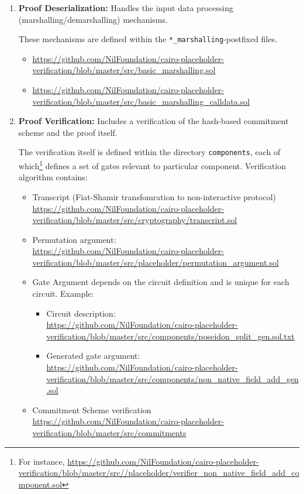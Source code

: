 \begin{enumerate}
    \item \textbf{Proof Deserialization:} Handles the input data processing (marshalling/demarshalling) mechanisms.

    These mechanisms are defined within the \texttt{*\_marshalling}-postfixed files.
    \begin{itemize}
        \item
            \url{https://github.com/NilFoundation/cairo-placeholder-verification/blob/master/src/basic_marshalling.sol}
        \item
            \url{https://github.com/NilFoundation/cairo-placeholder-verification/blob/master/src/basic_marshalling_calldata.sol}
    \end{itemize}

    \item \textbf{Proof Verification:} Includes a verification of the hash-based commitment scheme and the proof itself.

    The verification itself is defined within the directory \texttt{components}, each of which\footnote{
        For instance, \url{https://github.com/NilFoundation/cairo-placeholder-verification/blob/master/src//placeholder/verifier_non_native_field_add_component.sol}
    } defines a set of gates
    relevant to particular component.
    Verification algorithm contains:
    \begin{itemize}
        \item Transcript (Fiat-Shamir transfomration to non-interactive protocol) \\
            \url{https://github.com/NilFoundation/cairo-placeholder-verification/blob/master/src/cryptography/transcript.sol}
        \item Permutation argument: \\
            \url{https://github.com/NilFoundation/cairo-placeholder-verification/blob/master/src/placeholder/permutation_argument.sol}
        \item Gate Argument depends on the circuit definition and is unique for each circuit.
                Example:
            \begin{itemize}
                \item Circuit description: \\
                    \url{https://github.com/NilFoundation/cairo-placeholder-verification/blob/master/src/components/poseidon_split_gen.sol.txt}
                \item Generated gate argument: \\
                    \url{https://github.com/NilFoundation/cairo-placeholder-verification/blob/master/src/components/non_native_field_add_gen.sol} 
            \end{itemize}
        \item Commitment Scheme verification \\
            \url{https://github.com/NilFoundation/cairo-placeholder-verification/blob/master/src/commitments}
    \end{itemize}
\end{enumerate}

